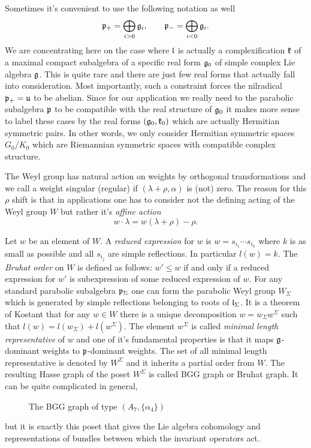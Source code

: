 \documentclass[12pt,a4paper,final]{report}
\begin{document}
Sometimes it's convenient to use the following notation as well 
 \[
 \mathfrak{p}_+ = \bigoplus_{i > 0} \mathfrak{g}_i, \qquad \mathfrak{p}_- = \bigoplus_{i < 0} \mathfrak{g}_i.
 \]
We are concentrating here on the case where $\mathfrak{l}$ is actually a complexification $\mathfrak{k}$ of a maximal compact subalgebra of a specific real form $\mathfrak{g}_0$ of simple complex Lie algebra $\mathfrak{g}$. This is quite rare and there are just few real forms that actually fall into consideration. Most importantly, such a constraint forces the nilradical $\mathfrak{p}_+ = \mathfrak{u}$ to be abelian. Since for our application we really need to the parabolic subalgebra $\mathfrak{p}$ to be compatible with the real structure of $\mathfrak{g}_0$ it makes more sense to label these cases by the real forms $(\mathfrak{g}_0, \mathfrak{k}_0)$ which are actually Hermitian symmetric pairs. In other words, we only consider Hermitian symmetric spaces $G_0/K_0$ which are Riemannian symmetric spaces with compatible complex structure.


The Weyl group has natural action on weights by orthogonal transformations and we call a weight singular (regular) if $(\lambda + \rho, \alpha)$ is (not) zero. The reason for this $\rho$ shift is that in applications one has to consider not the defining acting of the Weyl group $W$ but rather it's \emph{affine action} 
\[
 w \cdot \lambda = w(\lambda + \rho) - \rho.
\]

Let $w$ be an element of $W$. A \emph{reduced expression} for $w$ is $w = s_{i_1} \cdots s_{i_k}$ where $k$ is as small as possible and all $s_{i_j}$ are simple reflections. In particular $l(w) = k$. The \emph{Bruhat order} on $W$ is defined as follows: $w' \leq w$ if and only if a reduced expression for $w'$ is subexpression of some reduced expression of $w.$ For any standard parabolic subalgebra $\mathfrak{p}_\Sigma$ one can form the parabolic Weyl group $W_\Sigma$ which is generated by simple reflections belonging to roots of $\mathfrak{l}_\Sigma$. It is a theorem of Kostant \cite{kostant_lie_1961} that for any $w \in W$ there is a unique decomposition $w = w_\Sigma w^\Sigma$ such that $l(w) = l(w_\Sigma) + l(w^\Sigma)$. The element $w^\Sigma$ is called \emph{minimal length representative} of $w$ and one of it's fundamental properties is that it maps $\mathfrak{g}$-dominant weights to $\mathfrak{p}$-dominant weights. The set of all minimal length representative is denoted by $W^\Sigma$ and it inherits a partial order from $W$. The resulting Hasse graph of the poset $W^\Sigma$ is called BGG graph or Bruhat graph. It can be quite complicated in general,
\begin{figure}[H]
  \centering 
  
  \caption{The BGG graph of type $(A_7, \{\alpha_4\})$}
\end{figure} 
but it is exactly this poset that gives the Lie algebra cohomology and representations of bundles between which the invariant operators act.
\end{document}
